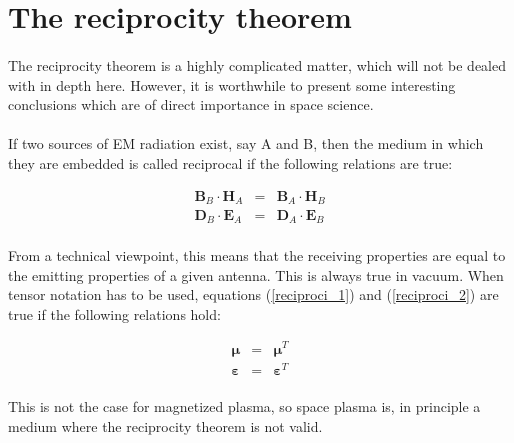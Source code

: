 \documentclass[a4paper,10pt]{thesis}
\begin{document}
\section{\textbf{The reciprocity theorem}}

\paragraph*{}
The reciprocity theorem is a highly complicated matter, which will not be dealed with in depth here. However, it is worthwhile to present some interesting conclusions which are of direct importance in space science.

\paragraph*{}
If two sources of EM radiation exist, say A and B, then the medium in which they are embedded is called reciprocal if the following relations are true:

\begin{eqnarray}
\mathbf{B}_B \cdot \mathbf{H}_A &=& \mathbf{B}_A \cdot \mathbf{H}_B \label{reciproci_1} \\
\mathbf{D}_B \cdot \mathbf{E}_A &=& \mathbf{D}_A \cdot \mathbf{E}_B \label{reciproci_2}
\end{eqnarray}

\paragraph*{}
From a technical viewpoint, this means that the receiving properties are equal to the emitting properties of a given antenna. This is always true in vacuum. When tensor notation has to be used, equations (\ref{reciproci_1}) and (\ref{reciproci_2}) are true if the following relations hold:

\begin{eqnarray}
\mathbf{\mu} &=& \mathbf{\mu}^T \label{reciproci_tensor_1} \\
\mathbf{\varepsilon} &=& \mathbf{\varepsilon}^T \label{reciproci_tensor_2}
\end{eqnarray}

\paragraph*{}
This is not the case for magnetized plasma, so space plasma is, in principle a medium where the reciprocity theorem is not valid.
\end{document}
